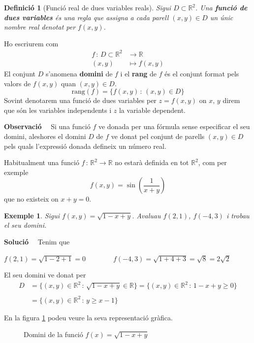 \documentclass[12pt]{article}
\newcommand{\observacio}{\textbf{Observaci{\'o}}\ \ }
\newcommand{\solucio}{\textbf{Soluci{\'o}}\ \ }
\newtheorem{definicio}{Definici{\'o}}[subsection]
\newtheorem{exemple}{Exemple}[subsection]
\newcommand{\R}{\mathbb{R}}
\begin{document}
\begin{definicio}[Funci{\'o} real de dues variables reals]
Sigui $D\subset \R^2$. Una \textbf{funci{\'o} de dues variables} {\'e}s una
regla que assigna a cada parell $(x,y)\in D$ un {\'u}nic nombre
real denotat per $f(x,y)$.
\end{definicio}

Ho escriurem com
\begin{align*}
f\, :\, D\subset\R^2 & \longrightarrow \R \\ (x,y) & \mapsto
f(x,y)
\end{align*}
El conjunt $D$ s'anomena \textbf{domini} de $f$ i el \textbf{rang} de $f$ {\'e}s el
conjunt format pels valors de $f(x,y)$ quan $(x,y)\in D$.
\[
\mbox{rang}(f)=\{f(x,y)\, : \, (x,y)\in D \}
\]
Sovint denotarem una funci{\'o} de dues variables per $z=f(x,y)$ on
$x,\, y$ direm que s{\'o}n les variables independents i $z$ la
variable dependent.



\vspace{0.4cm}
\observacio
Si una funci{\'o} $f$ ve donada per una f{\'o}rmula sense especificar
el seu domini, aleshores el domini $D$ de $f$ ve donat pel conjunt
de parells $(x,y)\in D$ pels quals l'expressi{\'o} donada defineix
un n{\'u}mero real.


Habitualment una funci{\'o} $f\, :\, \R^2\longrightarrow \R$ no
estar{\`a} definida en tot $\R^2$, com per exemple
\[
f(x,y)=\sin \left( \frac{1}{x+y}\right)
\]
que no existeix on $x+y=0$.


\vspace{0.4cm}
\begin{exemple}
Sigui $f(x,y)=\sqrt{1-x+y}$. Avaluau $f(2,1)$, $f(-4,3)$ i trobau
el seu domini.
\end{exemple}

\solucio
Tenim que

$
  f(2,1)  =  \sqrt{1-2+1}=0\qquad \qquad f(-4,3) = \sqrt{1+4+3}=\sqrt{8}=2\sqrt{2}$

El seu domini ve donat per
\begin{align*}
  D & = \{ (x,y)\in \R^2\, :\, \sqrt{1-x+y}\in \R \} = \{ (x,y)\in \R^2\, :\, 1-x+y\geq 0 \} \\
  &\\
   & =\{ (x,y)\in \R^2\, :\, y\geq x-1 \}
\end{align*}

En la figura \ref{fig1} podeu veure la seva representaci{\'o} gr{\`a}fica.

\begin{figure}[h!]
\begin{center}
\vspace{-.4cm}
\end{center}
\caption{Domini de la funci{\'o} $f(x)=\sqrt{1-x+y}$}\label{fig1}
\end{figure}
\end{document}
